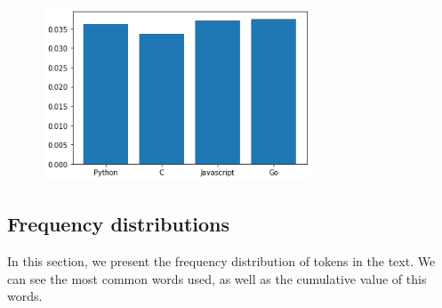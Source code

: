 \documentclass[]{article}
\begin{document}
\begin{enumerate}
          \begin{figure}[H]
              \includegraphics[width=8cm]{long_words.png}
              \centering
          \end{figure}

\end{enumerate}

\subsection{Frequency distributions}
In this section, we present the frequency distribution of tokens in the text. We can see the most common words used, as well as the cumulative value of this words.
\end{document}

